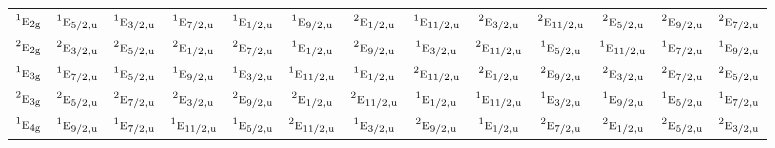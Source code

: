 \documentclass[10pt,a4paper]{article}
\numberwithin{equation}{section}
\newcommand{\irr}[1]{\text{\normalfont\scshape #1}}
\newcommand{\conjpair}[1]{{}^{#1}}
\newcommand{\ptag}[1]{\mathrm{#1}}
\begin{document}
{\begin{longtable}{@{}lcccccccccccc@{}}
$\conjpair{1}\irr{e}_{2\ptag{g}}$ & $\conjpair{1}\irr{e}_{5/2,\ptag{u}}$ & $\conjpair{1}\irr{e}_{3/2,\ptag{u}}$ & $\conjpair{1}\irr{e}_{7/2,\ptag{u}}$ & $\conjpair{1}\irr{e}_{1/2,\ptag{u}}$ & $\conjpair{1}\irr{e}_{9/2,\ptag{u}}$ & $\conjpair{2}\irr{e}_{1/2,\ptag{u}}$ & $\conjpair{1}\irr{e}_{11/2,\ptag{u}}$ & $\conjpair{2}\irr{e}_{3/2,\ptag{u}}$ & $\conjpair{2}\irr{e}_{11/2,\ptag{u}}$ & $\conjpair{2}\irr{e}_{5/2,\ptag{u}}$ & $\conjpair{2}\irr{e}_{9/2,\ptag{u}}$ & $\conjpair{2}\irr{e}_{7/2,\ptag{u}}$\\
$\conjpair{2}\irr{e}_{2\ptag{g}}$ & $\conjpair{2}\irr{e}_{3/2,\ptag{u}}$ & $\conjpair{2}\irr{e}_{5/2,\ptag{u}}$ & $\conjpair{2}\irr{e}_{1/2,\ptag{u}}$ & $\conjpair{2}\irr{e}_{7/2,\ptag{u}}$ & $\conjpair{1}\irr{e}_{1/2,\ptag{u}}$ & $\conjpair{2}\irr{e}_{9/2,\ptag{u}}$ & $\conjpair{1}\irr{e}_{3/2,\ptag{u}}$ & $\conjpair{2}\irr{e}_{11/2,\ptag{u}}$ & $\conjpair{1}\irr{e}_{5/2,\ptag{u}}$ & $\conjpair{1}\irr{e}_{11/2,\ptag{u}}$ & $\conjpair{1}\irr{e}_{7/2,\ptag{u}}$ & $\conjpair{1}\irr{e}_{9/2,\ptag{u}}$\\
$\conjpair{1}\irr{e}_{3\ptag{g}}$ & $\conjpair{1}\irr{e}_{7/2,\ptag{u}}$ & $\conjpair{1}\irr{e}_{5/2,\ptag{u}}$ & $\conjpair{1}\irr{e}_{9/2,\ptag{u}}$ & $\conjpair{1}\irr{e}_{3/2,\ptag{u}}$ & $\conjpair{1}\irr{e}_{11/2,\ptag{u}}$ & $\conjpair{1}\irr{e}_{1/2,\ptag{u}}$ & $\conjpair{2}\irr{e}_{11/2,\ptag{u}}$ & $\conjpair{2}\irr{e}_{1/2,\ptag{u}}$ & $\conjpair{2}\irr{e}_{9/2,\ptag{u}}$ & $\conjpair{2}\irr{e}_{3/2,\ptag{u}}$ & $\conjpair{2}\irr{e}_{7/2,\ptag{u}}$ & $\conjpair{2}\irr{e}_{5/2,\ptag{u}}$\\
$\conjpair{2}\irr{e}_{3\ptag{g}}$ & $\conjpair{2}\irr{e}_{5/2,\ptag{u}}$ & $\conjpair{2}\irr{e}_{7/2,\ptag{u}}$ & $\conjpair{2}\irr{e}_{3/2,\ptag{u}}$ & $\conjpair{2}\irr{e}_{9/2,\ptag{u}}$ & $\conjpair{2}\irr{e}_{1/2,\ptag{u}}$ & $\conjpair{2}\irr{e}_{11/2,\ptag{u}}$ & $\conjpair{1}\irr{e}_{1/2,\ptag{u}}$ & $\conjpair{1}\irr{e}_{11/2,\ptag{u}}$ & $\conjpair{1}\irr{e}_{3/2,\ptag{u}}$ & $\conjpair{1}\irr{e}_{9/2,\ptag{u}}$ & $\conjpair{1}\irr{e}_{5/2,\ptag{u}}$ & $\conjpair{1}\irr{e}_{7/2,\ptag{u}}$\\
$\conjpair{1}\irr{e}_{4\ptag{g}}$ & $\conjpair{1}\irr{e}_{9/2,\ptag{u}}$ & $\conjpair{1}\irr{e}_{7/2,\ptag{u}}$ & $\conjpair{1}\irr{e}_{11/2,\ptag{u}}$ & $\conjpair{1}\irr{e}_{5/2,\ptag{u}}$ & $\conjpair{2}\irr{e}_{11/2,\ptag{u}}$ & $\conjpair{1}\irr{e}_{3/2,\ptag{u}}$ & $\conjpair{2}\irr{e}_{9/2,\ptag{u}}$ & $\conjpair{1}\irr{e}_{1/2,\ptag{u}}$ & $\conjpair{2}\irr{e}_{7/2,\ptag{u}}$ & $\conjpair{2}\irr{e}_{1/2,\ptag{u}}$ & $\conjpair{2}\irr{e}_{5/2,\ptag{u}}$ & $\conjpair{2}\irr{e}_{3/2,\ptag{u}}$\\

\end{longtable}}
\end{document}
